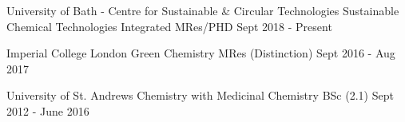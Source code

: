 
\begin{cventries}

  \cventry
    {University of Bath - Centre for Sustainable \& Circular Technologies} %
    {Sustainable Chemical Technologies} %
    {Integrated MRes/PHD} %
    {Sept 2018 - Present} %
    {}

  \cventry
    {Imperial College London} %
    {Green Chemistry} %
    {MRes (Distinction)} %
    {Sept 2016 - Aug 2017} %
    {}

  \cventry
    {University of St. Andrews} %
    {Chemistry with Medicinal Chemistry} %
    {BSc (2.1)} %
    {Sept 2012 - June 2016} %
    {}

\end{cventries}
